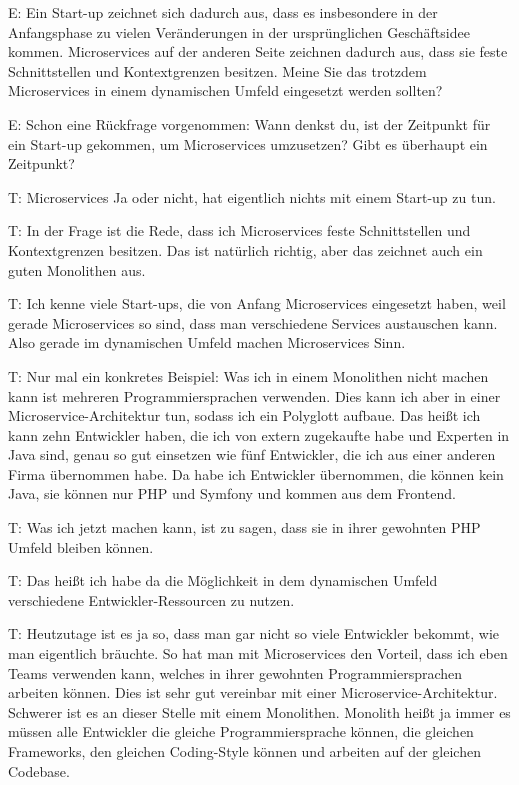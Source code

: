 E: Ein Start-up zeichnet sich dadurch aus, dass es insbesondere in der Anfangsphase zu vielen Veränderungen in der ursprünglichen Geschäftsidee kommen. Microservices auf der anderen Seite zeichnen dadurch aus, dass sie feste Schnittstellen und Kontextgrenzen besitzen. Meine Sie das trotzdem Microservices in einem dynamischen Umfeld eingesetzt werden sollten?

E: Schon eine Rückfrage vorgenommen: Wann denkst du, ist der Zeitpunkt für ein Start-up gekommen, um Microservices umzusetzen? Gibt es überhaupt ein Zeitpunkt? 

\label{appendix:t-3}
T: Microservices Ja oder nicht, hat eigentlich nichts mit einem Start-up zu tun.

\label{appendix:t-4}
T: In der Frage ist die Rede, dass ich Microservices feste Schnittstellen und Kontextgrenzen besitzen. Das ist natürlich richtig, aber das zeichnet auch ein guten Monolithen aus.

\label{appendix:t-5}
T: Ich kenne viele Start-ups, die von Anfang Microservices eingesetzt haben, weil gerade Microservices so sind, dass man verschiedene Services austauschen kann. Also gerade im dynamischen Umfeld machen Microservices Sinn.

T: Nur mal ein konkretes Beispiel: Was ich in einem Monolithen nicht machen kann ist mehreren Programmiersprachen verwenden. Dies kann ich aber in einer Microservice-Architektur tun, sodass ich ein Polyglott aufbaue. Das heißt ich kann zehn Entwickler haben, die ich von extern zugekaufte habe und Experten in Java sind, genau so gut einsetzen wie fünf Entwickler, die ich aus einer anderen Firma übernommen habe. Da habe ich Entwickler übernommen, die können kein Java, sie können nur PHP und Symfony und kommen aus dem Frontend.

T: Was ich jetzt machen kann, ist zu sagen, dass sie in ihrer gewohnten PHP Umfeld bleiben können.

\label{appendix:t-6}
T: Das heißt ich habe da die Möglichkeit in dem dynamischen Umfeld verschiedene Entwickler-Ressourcen zu nutzen.

T: Heutzutage ist es ja so, dass man gar nicht so viele Entwickler bekommt, wie man eigentlich bräuchte. So hat man mit Microservices den Vorteil, dass ich eben Teams verwenden kann, welches in ihrer gewohnten Programmiersprachen arbeiten können. Dies ist sehr gut vereinbar mit einer Microservice-Architektur. Schwerer ist es an dieser Stelle mit einem Monolithen. Monolith heißt ja immer es müssen alle Entwickler die gleiche Programmiersprache können, die gleichen Frameworks, den gleichen Coding-Style können und arbeiten auf der gleichen Codebase.

